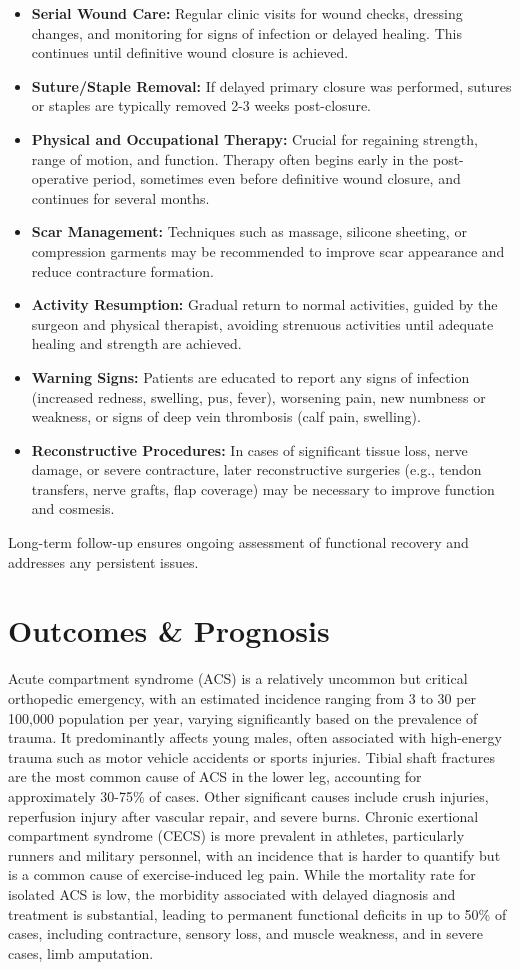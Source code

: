 \begin{itemize}
  \item \textbf{Serial Wound Care:} Regular clinic visits for wound checks, dressing changes, and monitoring for signs of infection or delayed healing. This continues until definitive wound closure is achieved.
  \item \textbf{Suture/Staple Removal:} If delayed primary closure was performed, sutures or staples are typically removed 2-3 weeks post-closure.
  \item \textbf{Physical and Occupational Therapy:} Crucial for regaining strength, range of motion, and function. Therapy often begins early in the post-operative period, sometimes even before definitive wound closure, and continues for several months.
  \item \textbf{Scar Management:} Techniques such as massage, silicone sheeting, or compression garments may be recommended to improve scar appearance and reduce contracture formation.
  \item \textbf{Activity Resumption:} Gradual return to normal activities, guided by the surgeon and physical therapist, avoiding strenuous activities until adequate healing and strength are achieved.
  \item \textbf{Warning Signs:} Patients are educated to report any signs of infection (increased redness, swelling, pus, fever), worsening pain, new numbness or weakness, or signs of deep vein thrombosis (calf pain, swelling).
  \item \textbf{Reconstructive Procedures:} In cases of significant tissue loss, nerve damage, or severe contracture, later reconstructive surgeries (e.g., tendon transfers, nerve grafts, flap coverage) may be necessary to improve function and cosmesis.
\end{itemize}

Long-term follow-up ensures ongoing assessment of functional recovery and addresses any persistent issues.

\section*{Outcomes \& Prognosis}
Acute compartment syndrome (ACS) is a relatively uncommon but critical orthopedic emergency, with an estimated incidence ranging from 3 to 30 per 100,000 population per year, varying significantly based on the prevalence of trauma. It predominantly affects young males, often associated with high-energy trauma such as motor vehicle accidents or sports injuries. Tibial shaft fractures are the most common cause of ACS in the lower leg, accounting for approximately 30-75\% of cases. Other significant causes include crush injuries, reperfusion injury after vascular repair, and severe burns. Chronic exertional compartment syndrome (CECS) is more prevalent in athletes, particularly runners and military personnel, with an incidence that is harder to quantify but is a common cause of exercise-induced leg pain. While the mortality rate for isolated ACS is low, the morbidity associated with delayed diagnosis and treatment is substantial, leading to permanent functional deficits in up to 50\% of cases, including contracture, sensory loss, and muscle weakness, and in severe cases, limb amputation.


